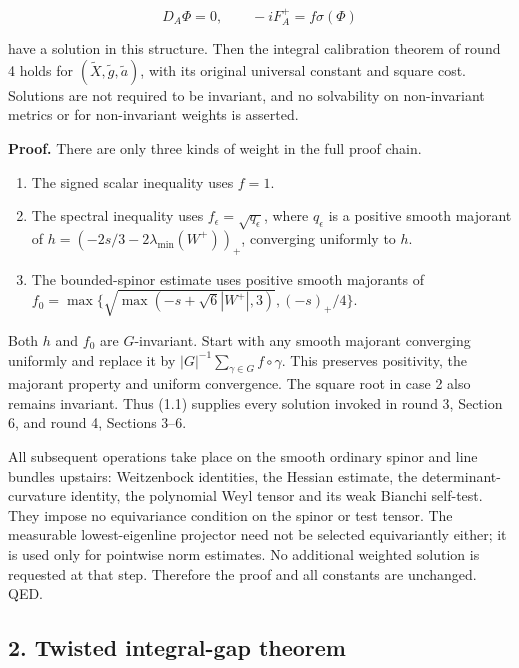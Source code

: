 \documentclass[
  10pt,
]{article}
\providecommand{\tightlist}{%
  \setlength{\itemsep}{0pt}\setlength{\parskip}{0pt}}
\begin{document}
\[
 D_A\Phi=0,\qquad -iF_A^+=f\sigma(\Phi)                 \tag{1.1}
\]

have a solution in this structure. Then the integral calibration theorem
of round 4 holds for \((\widetilde X,\widetilde g,\widetilde a)\), with
its original universal constant and square cost. Solutions are not
required to be invariant, and no solvability on non-invariant metrics or
for non-invariant weights is asserted.

\textbf{Proof.} There are only three kinds of weight in the full proof
chain.

\begin{enumerate}
\def\labelenumi{\arabic{enumi}.}
\tightlist
\item
  The signed scalar inequality uses \(f=1\).
\item
  The spectral inequality uses \(f_\epsilon=\sqrt{q_\epsilon}\), where
  \(q_\epsilon\) is a positive smooth majorant of
  \(h=(-2s/3-2\lambda_{\min}(W^+))_+\), converging uniformly to \(h\).
\item
  The bounded-spinor estimate uses positive smooth majorants of
  \(f_0=\max\{\sqrt{\max(-s+\sqrt6|W^+|,3)},(-s)_+/4\}\).
\end{enumerate}

Both \(h\) and \(f_0\) are \(G\)-invariant. Start with any smooth
majorant converging uniformly and replace it by
\(|G|^{-1}\sum_{\gamma\in G}f\circ\gamma\). This preserves positivity,
the majorant property and uniform convergence. The square root in case 2
also remains invariant. Thus (1.1) supplies every solution invoked in
round 3, Section 6, and round 4, Sections 3--6.

All subsequent operations take place on the smooth ordinary spinor and
line bundles upstairs: Weitzenbock identities, the Hessian estimate, the
determinant-curvature identity, the polynomial Weyl tensor and its weak
Bianchi self-test. They impose no equivariance condition on the spinor
or test tensor. The measurable lowest-eigenline projector need not be
selected equivariantly either; it is used only for pointwise norm
estimates. No additional weighted solution is requested at that step.
Therefore the proof and all constants are unchanged. QED.

\hypertarget{twisted-integral-gap-theorem}{%
\subsection{2. Twisted integral-gap
theorem}\label{twisted-integral-gap-theorem}}
\end{document}
